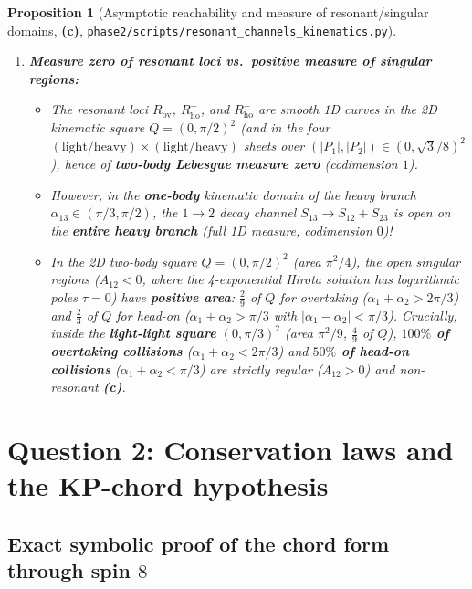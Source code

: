 \documentclass[11pt,a4paper]{article}
\newcommand{\Lc}{\textsf{\textbf{(c)}}\xspace}
\newcommand{\skin}{\texttt{phase2/\allowbreak scripts/\allowbreak resonant\_\allowbreak channels\_\allowbreak kinematics.py}}
\newtheorem{proposition}{Proposition}[section]
\theoremstyle{remark}
\begin{document}
\begin{proposition}[Asymptotic reachability and measure of resonant/singular domains, \Lc, \skin]
\begin{enumerate}
\item \textbf{Measure zero of resonant loci vs.\ positive measure of singular regions:}
\begin{itemize}
\item The resonant loci $R_{\mathrm{ov}}$, $R_{\mathrm{ho}}^+$, and
$R_{\mathrm{ho}}^-$ are smooth 1D curves in the 2D kinematic square
$Q = (0,\pi/2)^2$ (and in the four $(\text{light/heavy})\times(\text{light/heavy})$
sheets over $(|P_1|,|P_2|)\in(0,\sqrt{3}/8)^2$), hence of \textbf{two-body
Lebesgue measure zero} (codimension $1$).
\item However, in the \textbf{one-body} kinematic domain of the heavy branch
$\alpha_{13}\in(\pi/3,\pi/2)$, the $1\to 2$ decay channel $S_{13}\to S_{12}+S_{23}$
is open on the \textbf{entire heavy branch} (full 1D measure, codimension $0$)!
\item In the 2D two-body square $Q=(0,\pi/2)^2$ (area $\pi^2/4$), the open
singular regions ($A_{12}<0$, where the 4-exponential Hirota solution has
logarithmic poles $\tau=0$) have \textbf{positive area}: $\frac{2}{9}$ of $Q$
for overtaking ($\alpha_1+\alpha_2>2\pi/3$) and $\frac{2}{3}$ of $Q$ for head-on
($\alpha_1+\alpha_2>\pi/3$ with $|\alpha_1-\alpha_2|<\pi/3$). Crucially, inside
the \textbf{light-light square} $(0,\pi/3)^2$ (area $\pi^2/9$, $\frac{4}{9}$ of
$Q$), \textbf{$100\%$ of overtaking collisions} ($\alpha_1+\alpha_2<2\pi/3$)
and \textbf{$50\%$ of head-on collisions} ($\alpha_1+\alpha_2<\pi/3$) are
strictly regular ($A_{12}>0$) and non-resonant \Lc.
\end{itemize}
\end{enumerate}
\end{proposition}

\section{Question 2: Conservation laws and the KP-chord hypothesis}
\label{sec:conservation}

\subsection{Exact symbolic proof of the chord form through spin \texorpdfstring{$8$}{8}}
\end{document}
